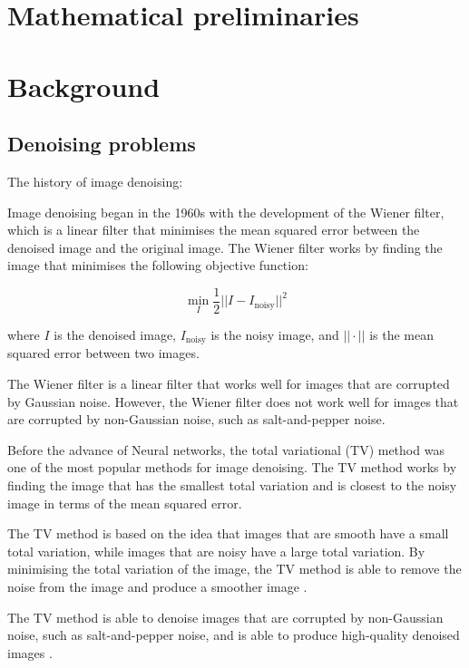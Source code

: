 \documentclass[12pt]{article}
\begin{document}

\section{Mathematical preliminaries}



\section{Background}

\subsection{Denoising problems}

The history of image denoising: 

Image denoising began in the 1960s with the development of the Wiener filter, which is a linear filter that minimises the mean squared error between the denoised image and the original image.
The Wiener filter works by finding the image that minimises the following objective function:

\[
\min_{I} \frac{1}{2} ||I - I_{\text{noisy}}||^2
\]

where $I$ is the denoised image, $I_{\text{noisy}}$ is the noisy image, and $||\cdot||$ is the mean squared error between two images.

The Wiener filter is a linear filter that works well for images that are corrupted by Gaussian noise.
However, the Wiener filter does not work well for images that are corrupted by non-Gaussian noise, such as salt-and-pepper noise.

Before the advance of Neural networks, the total variational (TV) method was one of the most popular methods for image denoising.
The TV method works by finding the image that has the smallest total variation and is closest to the noisy image in terms of the mean squared error.

The TV method is based on the idea that images that are smooth have a small total variation, while images that are noisy have a large total variation.
By minimising the total variation of the image, the TV method is able to remove the noise from the image and produce a smoother image \cite{rudin1992nonlinear}.

The TV method is able to denoise images that are corrupted by non-Gaussian noise, such as salt-and-pepper noise, and is able to produce high-quality denoised images \cite{rudin1992nonlinear}.
\end{document}
